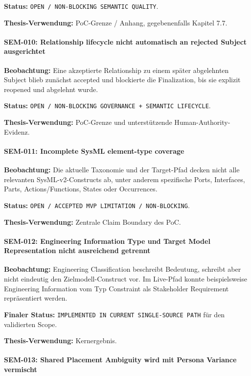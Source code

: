 \textbf{Status:}
\texttt{OPEN / NON-BLOCKING SEMANTIC QUALITY}.

\textbf{Thesis-Verwendung:}
PoC-Grenze / Anhang, gegebenenfalls Kapitel 7.7.


\paragraph{SEM-010: Relationship lifecycle nicht automatisch an rejected Subject ausgerichtet}

\textbf{Beobachtung:}
Eine akzeptierte Relationship zu einem später abgelehnten Subject blieb zunächst
accepted und blockierte die Finalization, bis sie explizit reopened und abgelehnt
wurde.

\textbf{Status:}
\texttt{OPEN / NON-BLOCKING GOVERNANCE + SEMANTIC LIFECYCLE}.

\textbf{Thesis-Verwendung:}
PoC-Grenze und unterstützende Human-Authority-Evidenz.


\paragraph{SEM-011: Incomplete SysML element-type coverage}

\textbf{Beobachtung:}
Die aktuelle Taxonomie und der Target-Pfad decken nicht alle relevanten
SysML-v2-Constructs ab, unter anderem spezifische Ports, Interfaces, Parts,
Actions/Functions, States oder Occurrences.

\textbf{Status:}
\texttt{OPEN / ACCEPTED MVP LIMITATION / NON-BLOCKING}.

\textbf{Thesis-Verwendung:}
Zentrale Claim Boundary des PoC.


\paragraph{SEM-012: Engineering Information Type und Target Model Representation nicht ausreichend getrennt}

\textbf{Beobachtung:}
Engineering Classification beschreibt Bedeutung, schreibt aber nicht eindeutig
den Zielmodell-Construct vor. Im Live-Pfad konnte beispielsweise Engineering
Information vom Typ Constraint als Stakeholder Requirement repräsentiert werden.

\textbf{Finaler Status:}
\texttt{IMPLEMENTED IN CURRENT SINGLE-SOURCE PATH} für den validierten Scope.

\textbf{Thesis-Verwendung:}
Kernergebnis.


\paragraph{SEM-013: Shared Placement Ambiguity wird mit Persona Variance vermischt}

